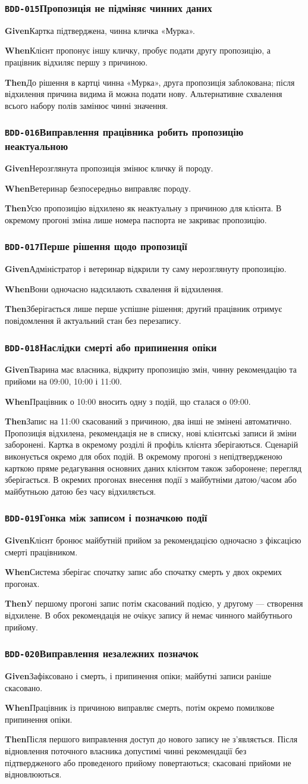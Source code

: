 \documentclass[11pt,a4paper]{article}
\newcommand{\scenario}[5]{%
  \Needspace{8\baselineskip}%
  \subsubsection*{\hypertarget{#1}{\texttt{#1}}\quad #2}%
  \textbf{Given}\quad #3\par
  \textbf{When}\quad #4\par
  \textbf{Then}\quad #5\par\medskip}
\begin{document}
\scenario{BDD-015}{Пропозиція не підміняє чинних даних}{Картка підтверджена, чинна кличка «Мурка».}{Клієнт пропонує іншу кличку, пробує подати другу пропозицію, а працівник відхиляє першу з причиною.}{До рішення в картці чинна «Мурка», друга пропозиція заблокована; після відхилення причина видима й можна подати нову. Альтернативне схвалення всього набору полів замінює чинні значення.}

\scenario{BDD-016}{Виправлення працівника робить пропозицію неактуальною}{Нерозглянута пропозиція змінює кличку й породу.}{Ветеринар безпосередньо виправляє породу.}{Усю пропозицію відхилено як неактуальну з причиною для клієнта. В окремому прогоні зміна лише номера паспорта не закриває пропозицію.}

\scenario{BDD-017}{Перше рішення щодо пропозиції}{Адміністратор і ветеринар відкрили ту саму нерозглянуту пропозицію.}{Вони одночасно надсилають схвалення й відхилення.}{Зберігається лише перше успішне рішення; другий працівник отримує повідомлення й актуальний стан без перезапису.}

\scenario{BDD-018}{Наслідки смерті або припинення опіки}{Тварина має власника, відкриту пропозицію змін, чинну рекомендацію та прийоми на 09:00, 10:00 і 11:00.}{Працівник о 10:00 вносить одну з подій, що сталася о 09:00.}{Запис на 11:00 скасований з причиною, два інші не змінені автоматично. Пропозиція відхилена, рекомендація не в списку, нові клієнтські записи й зміни заборонені. Картка в окремому розділі й профіль клієнта зберігаються. Сценарій виконується окремо для обох подій. В окремому прогоні з непідтвердженою карткою пряме редагування основних даних клієнтом також заборонене; перегляд зберігається. В окремих прогонах внесення події з майбутніми датою/часом або майбутньою датою без часу відхиляється.}

\scenario{BDD-019}{Гонка між записом і позначкою події}{Клієнт бронює майбутній прийом за рекомендацією одночасно з фіксацією смерті працівником.}{Система зберігає спочатку запис або спочатку смерть у двох окремих прогонах.}{У першому прогоні запис потім скасований подією, у другому — створення відхилене. В обох рекомендація не очікує запису й немає чинного майбутнього прийому.}

\scenario{BDD-020}{Виправлення незалежних позначок}{Зафіксовано і смерть, і припинення опіки; майбутні записи раніше скасовано.}{Працівник із причиною виправляє смерть, потім окремо помилкове припинення опіки.}{Після першого виправлення доступ до нового запису не з’являється. Після відновлення поточного власника допустимі чинні рекомендації без підтвердженого або проведеного прийому повертаються; скасовані прийоми не відновлюються.}
\end{document}
